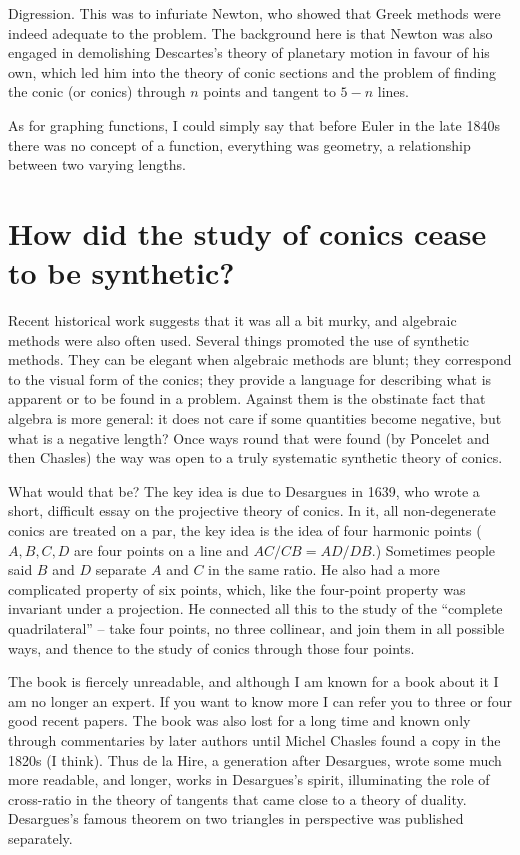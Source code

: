 \documentclass[11pt]{book}
\begin{document}
Digression. This was to infuriate Newton, who showed that Greek methods were indeed adequate to the problem. The background here is that Newton was also engaged in demolishing Descartes's theory of planetary motion in favour of his own, which led him into the theory of conic sections and the problem of finding the conic (or conics) through $n$ points and tangent to $5-n$ lines.

As for graphing functions, I could simply say that before Euler in the late 1840s there was no concept of a function, everything was geometry, a relationship between two varying lengths.

\section{How did the study of conics cease to be synthetic?}
Recent historical work suggests that it was all a bit murky, and algebraic methods were also often used. Several things promoted the use of synthetic methods. They can be elegant when algebraic methods are blunt; they correspond to the visual form of the conics; they provide a language for describing what is apparent or to be found in a problem. Against them is the obstinate fact that algebra is more general: it does not care if some quantities become negative, but what is a negative length? Once ways round that were found (by Poncelet and then Chasles) the way was open to a truly systematic synthetic theory of conics.   

What would that be? The key idea is due to Desargues in 1639, who wrote a short, difficult essay on the projective theory of conics. In it, all non-degenerate conics are treated on a par, the key idea is the idea of four harmonic points ($A,  B, C, D$ are four points on a line and $AC/CB=AD/DB.$) Sometimes people said $B$ and $D$ separate $A$ and $C$ in the same ratio. He also had a more complicated property of six points, which, like the four-point property was invariant under a projection. He connected all this to the study of the ``complete quadrilateral'' -- take four points, no three collinear, and join them in all possible ways, and thence to the study of conics through those four points. 

The book is fiercely unreadable, and although I am known for a book about it I am no longer an expert. If you want to know more I can refer you to three or four good recent papers. The book was also lost for a long time and known only through commentaries by later authors until Michel Chasles found a copy in the 1820s (I think). Thus de la Hire, a generation after Desargues, wrote some much more readable, and longer, works in Desargues's spirit, illuminating the role of cross-ratio in the theory of tangents that came close to a theory of duality. Desargues's famous theorem on two triangles in perspective was published separately.
\end{document}
